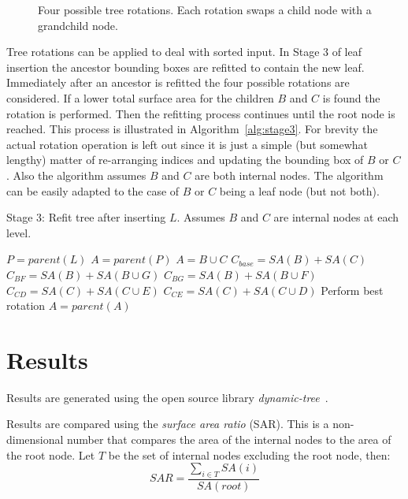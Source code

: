 \documentclass{article}
\begin{document}
\begin{figure}
	\begin{center}
		
	\end{center}
	\caption{Four possible tree rotations. Each rotation swaps a child node with a grandchild node.}
	\label{fig:possible_rotations}
\end{figure}

Tree rotations can be applied to deal with sorted input. In Stage 3 of leaf insertion the ancestor bounding boxes are refitted to contain the new leaf. Immediately after an ancestor is refitted the four possible rotations are considered. If a lower total surface area for the children $B$ and $C$ is found the rotation is performed. Then the refitting process continues until the root node is reached. This process is illustrated in Algorithm~\ref{alg:stage3}. For brevity the actual rotation operation is left out since it is just a simple (but somewhat lengthy) matter of re-arranging indices and updating the bounding box of $B$ or $C$. Also the algorithm assumes $B$ and $C$ are both internal nodes. The algorithm can be easily adapted to the case of $B$ or $C$ being a leaf node (but not both).

\begin{algorithm}
	\caption{Stage 3: Refit tree after inserting $L$. Assumes $B$ and $C$ are internal nodes at each level.}
	\label{alg:stage3}
	\begin{algorithmic}
		\STATE $P = parent(L)$
		\STATE $A = parent(P)$
		\STATE {}
		\STATE $A = B \cup C$ 
		\STATE {}
		\STATE $C_{base} = SA(B) + SA(C)$
		\STATE $C_{BF} = SA(B) + SA(B \cup G)$
		\STATE $C_{BG} = SA(B) + SA(B \cup F)$
		\STATE $C_{CD} = SA(C) + SA(C \cup E)$
		\STATE $C_{CE} = SA(C) + SA(C \cup D)$
		\STATE Perform best rotation 
		\STATE $A = parent(A)$
		\ENDWHILE
	\end{algorithmic}
\end{algorithm}

\section{Results}
Results are generated using the open source library \emph{dynamic-tree}~\cite{Catto2019}.

Results are compared using the \emph{surface area ratio} (SAR). This is a non-dimensional number that compares the area of the internal nodes to the area of the root node. Let $T$ be the set of internal nodes excluding the root node, then:
\begin{equation}
	SAR = \frac{\sum_{i \in T} SA(i)}{SA(root)}
\end{equation}
\end{document}
